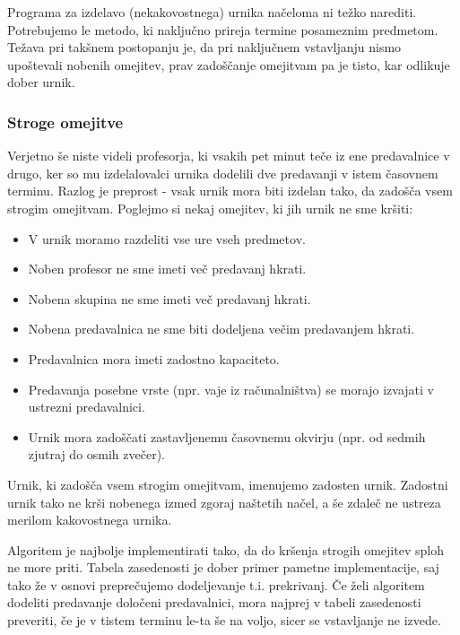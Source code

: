 \documentclass[a4paper, 10pt]{article}
\begin{document}
Programa za izdelavo (nekakovostnega) urnika načeloma ni težko narediti. Potrebujemo
le metodo, ki naključno prireja termine posameznim predmetom. Težava pri takšnem postopanju
je, da pri naključnem vstavljanju nismo upoštevali nobenih omejitev, prav zadoščanje omejitvam
pa je tisto, kar odlikuje dober urnik.

\subsubsection{Stroge omejitve} 

Verjetno še niste videli profesorja, ki vsakih pet minut teče iz ene predavalnice v drugo,
ker so mu izdelalovalci urnika dodelili dve predavanji v istem časovnem terminu. Razlog
je preprost - vsak urnik mora biti izdelan tako, da zadošča vsem strogim omejitvam.
Poglejmo si nekaj omejitev, ki jih urnik ne sme kršiti:


\begin{itemize}
   
   \item V urnik moramo razdeliti vse ure vseh predmetov.
   \item Noben profesor ne sme imeti več predavanj hkrati.
   \item Nobena skupina ne sme imeti več predavanj hkrati.
   \item Nobena predavalnica ne sme biti dodeljena večim predavanjem hkrati.
   \item Predavalnica mora imeti zadostno kapaciteto.
   \item Predavanja posebne vrste (npr. vaje iz računalništva) se morajo izvajati v ustrezni predavalnici.
   \item Urnik mora zadoščati zastavljenemu časovnemu okvirju (npr. od sedmih zjutraj do osmih zvečer).
   
\end{itemize}

Urnik, ki zadošča vsem strogim omejitvam, imenujemo zadosten urnik. Zadostni urnik tako ne
krši nobenega izmed zgoraj naštetih načel, a še zdaleč ne ustreza merilom kakovostnega urnika.

Algoritem je najbolje implementirati tako, da do kršenja strogih omejitev sploh ne more priti.
Tabela zasedenosti je dober primer pametne implementacije, saj tako že v osnovi  preprečujemo
dodeljevanje t.i. prekrivanj. Če želi algoritem dodeliti predavanje določeni predavalnici,
mora najprej v tabeli zasedenosti preveriti, če je v tistem terminu le-ta še na voljo,
sicer se vstavljanje ne izvede.
\end{document}
